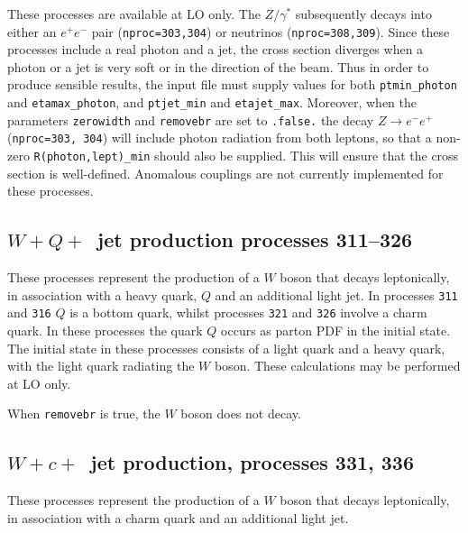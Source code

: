 These processes are available at LO only. The $Z/\gamma^*$ subsequently decays into 
either an $e^+ e^-$ pair ({\tt nproc=303,304}) or neutrinos ({\tt nproc=308,309}). 
Since these processes include a real photon and a jet, the cross section diverges
when a photon or a jet is very soft or in the direction of the beam.
Thus in order to produce sensible results, the input file must supply values for both
{\tt ptmin\_photon} and {\tt etamax\_photon}, and {\tt ptjet\_min} and {\tt etajet\_max}.
 Moreover, when the parameters {\tt zerowidth}
and {\tt removebr} are set to {\tt .false.} the decay $Z \to e^- e^+$ ({\tt nproc=303, 304})
will include photon radiation from both leptons, so that a non-zero {\tt R(photon,lept)\_min}
should also be supplied. This will ensure that the cross section is well-defined.
Anomalous couplings are not currently implemented for these processes. 




\subsection{$W+Q+$~jet production processes 311--326}
\label{subsec:wQj}

These processes represent the production of a $W$
boson that decays leptonically,
in association with a heavy quark, $Q$ and an additional light jet. In
processes {\tt 311} and {\tt 316} $Q$ is a bottom quark, whilst
processes {\tt 321} and {\tt 326} involve a charm quark.
In these processes the quark $Q$ occurs as parton PDF in the initial state. 
The initial state in these processes consists of a light quark and a heavy 
quark, with the light quark radiating the $W$ boson. These calculations may
be performed at LO only.

When {\tt removebr} is true, the $W$ boson does not decay.

\subsection{$W+c+$~jet production, processes 331, 336}
\label{subsec:wcj}

These processes represent the production of a $W$
boson that decays leptonically,
in association with a charm quark and an additional light jet. 

